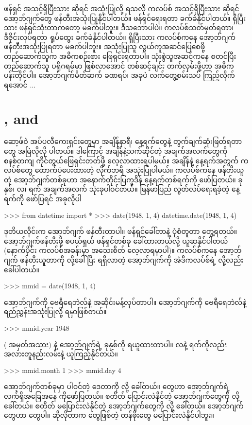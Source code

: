 ဖန်ရှင် အသင့်ရှိပြီးသား ဆိုရင်  အသုံးပြုလို့ ရသလို ကလပ်စ် အသင့်ရှိပြီးသား ဆိုရင် အော့ဘ်ဂျက်တွေ ဖန်တီးအသုံးပြုနိုင်ပါတယ်။ ဖန်ရှင်ရေးရတာ ခက်ခဲနိုင်ပါတယ်။ ရှိပြီးသား ဖန်ရှင်သုံးတာကတော့ မခက်ပါဘူး။ ဒီသဘောပါပဲ။ ကလပ်စ်သတ်မှတ်ရတာ၊ ဒီဇိုင်းလုပ်ရတာ ရှုပ်ထွေး ခက်ခဲနိုင်ပါတယ်။ ရှိပြီးသား ကလပ်စ်ကနေ အော့ဘ်ဂျက် ဖန်တီးအသုံးပြုရတာ မခက်ပါဘူး။ အသုံးပြုသူ လွယ်ကူအဆင်ပြေစေဖို့ တည်ဆောက်သူက အဓိကစဉ်းစား ဖြေရှင်းရတာပါ။ သုံးစွဲသူအဆင့်ကနေ စတင်ပြီး တည်ဆောက်သူ ပရိုဂရမ်မာ ဖြစ်လာအောင် တစ်ဆင့်ချင်း တက်လှမ်းဖို့ဟာ အဓိကပန်းတိုင်ပါ။ အော့ဘ်ဂျက်မိတ်ဆက် ခဏရပ်၊ အခုပဲ လက်တွေ့စမ်းသပ် ကြည့်လိုက်ရအောင် $\ldots$

\section{,  and }
ဆော့ဖ်ဝဲ အပ်ပလီကေးရှင်းတွေမှာ အချိန်နာရီ၊ နေ့ရက်တွေနဲ့ တွက်ချက်ဆုံးဖြတ်ရတာတွေ အမြဲလိုလို ပါတယ်။ ဒါကြောင့်  အချိန်နဲ့သက်ဆိုင်တဲ့ အချက်အလက်တွေကို စနစ်တကျ ကိုင်တွယ်ဖြေရှင်းတတ်ဖို့ လေ့လာထားရပါမယ်။  အချိန်နဲ့ နေ့ရက်အတွက် \fEn{,} \fEn{,}  ကလပ်စ်တွေ ထောက်ပံပေးထားတဲ့  လိုက်ဘရီ အသုံးပြုပါမယ်။  ကလပ်စ်ကနေ ဖန်တီးယူတဲ့ အော့ဘ်ဂျက်တစ်ခုဟာ အနောက်တိုင်းပြက္ခဒိန် နေ့ရက်တစ်ရက်ကို ဖော်ပြတယ်။ ခုနှစ်၊ လ၊ ရက် အချက်အလက် သုံးခုပါဝင်တယ်။ မြန်မာပြည် လွတ်လပ်ရေးရခဲ့တဲ့ နေ့ရက်ကို ဖော်ပြရင် အခုလိုပါ
\begin{codetxt}
>>> from datetime import *
>>> date(1948, 1, 4)
datetime.date(1948, 1, 4)
\end{codetxt}
ဒုတိယလိုင်းက အော့ဘ်ဂျက် ဖန်တီးတာပါ။ ဖန်ရှင်ခေါ်တာနဲ့ ပုံစံတူတာ တွေ့ရတယ်။ အော့ဘ်ဂျက်ဖန်တီးဖို့ စပယ်ရှယ် ဖန်ရှင်တစ်ခု ခေါ်ထားတယ်လို့ ယူဆနိုင်ပါတယ် (နောက်ပိုင်း ကလပ်စ်အခန်းမှာ အသေးစိတ် လေ့လာရမှာပါ)။ ကလပ်စ်ကနေ အော့ဘ်ဂျက် ဖန်တီးယူတာကို  လို့ခေါ်ပြီး ရရှိလာတဲ့ အော့ဘ်ဂျက်ကို အဲဒီကလပ်စ်ရဲ့  လို့လည်း ခေါ်ပါတယ်။ 
\begin{codetxt}
>>> mmid = date(1948, 1, 4)
\end{codetxt}
အော့ဘ်ဂျက်ကို ဗေရီရေဘဲလ်နဲ့ အဆိုင်းမန့်လုပ်တာပါ။ အော့ဘ်ဂျက်ကို  ဗေရီရေဘဲလ်နဲ့  ရည်ညွှန်းအသုံးပြုလို့ ရမှာဖြစ်တယ်။ 
\begin{codetxt}
>>> mmid.year
1948
\end{codetxt}
 (  အမှတ်အသား)  နဲ့ အော့ဘ်ဂျက်ရဲ့ ခုနှစ်ကို ရယူထားတာပါ။ လနဲ့ ရက်ကိုလည်း အလားတူနည်းလမ်းနဲ့ ယူကြည့်နိုင်တယ်။
\begin{codetxt}
>>> mmid.month
1
>>> mmid.day
4
\end{codetxt}
အော့ဘ်ဂျက်တစ်ခုမှာ ပါဝင်တဲ့ ဒေတာကို  လို့ ခေါ်တယ်။   တွေဟာ အော့ဘ်ဂျက်ရဲ့ လက်ရှိအခြေအနေ  ကိုဖော်ပြတယ်။ စတိတ် ပြောင်းလဲနိုင်တဲ့ အော့ဘ်ဂျက်တွေကို  လို့ ခေါ်တယ်။ စတိတ် မပြောင်းလဲနိုင်တဲ့ အော့ဘ်ဂျက်တွေကို   လို့ ခေါ်တယ်။  အော့ဘ်ဂျက်တွေဟာ  တွေပါ။ ဆိုလိုတာက  တွေဖြစ်တဲ့ \fEn{,} \fEn{,}  တန်ဖိုးတွေ မပြောင်းလဲနိုင်ပါဘူး။ 




